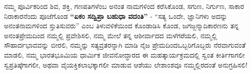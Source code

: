 ನಮ್ಮ ಪೂರ್ವಿಕರಿಂದ ಶಿವ, ಶಕ್ತಿ, ಗಣಪತಿಗಳೆಂಬ ಅನಂತ ನಾಮಗಳಿಂದ ಕರೆಸಿಕೊಂಡ, ಸಗುಣ, ನಿರ್ಗುಣ, ಸಾಕಾರ ನಿರಾಕಾರನೆಂದು ಪೂಜೆಗೊಂಡ \textbf{“ಏಕಂ ಸದ್ವಿಪ್ರಾ ಬಹುಧಾ ವದಂತಿ”} - “ಸತ್ಯ ಒಂದೇ, ಜ್ಞಾನಿಗಳು ಅದನ್ನು ಅನಂತನಾಮಗಳಿಂದ ಸ್ತುತಿಸುವರು” ಎಂಬ ತಿಳುವಳಿಕೆಯಿಂದ ಕೊಂಡಾಡಿಸಿ ಕೊಂಡ, ಜಗಜ್ಜನ್ಮಾದಿಕಾರಣನು ತನ್ನ ಅನಂತಪ್ರೇಮದಿಂದ ನಮ್ಮಲ್ಲಿ ಪ್ರವೇಶಿಸಲಿ, ನಮ್ಮ ಮೇಲೆ ತನ್ನ ಆಶೀರ್ವಾದದ ಮಳೆಗರೆಯಲಿ, ನಮ್ಮಲ್ಲಿ ಸೌಹಾರ್ದ\-ಭಾವವನ್ನು ಬೀರಲಿ, ನಮ್ಮನ್ನು ಸತ್ಯವ್ರತರನ್ನಾಗಿ ಮಾಡಿ ನೈಜ ಪ್ರೇಮದಿಂದ\break ಒಬ್ಬರಿಗೊಬ್ಬರು ನೆರವಾಗುವಂತೆ ಮಾಡಲಿ, ನಮ್ಮ ಭಾರತಭೂಮಿಯ ಧಾರ್ಮಿಕ ಜೀವನೋದ್ಧಾರದ ಈ ಮಹತ್ಕಾರ್ಯಕ್ರಮದಲ್ಲಿ ಸ್ವಂತ ಕೀರ್ತಿಗಾಗಲೀ ಸ್ವಪ್ರತಿಷ್ಠೆಗಾಗಲೀ, ಅಥವಾ ವೈಯಕ್ತಿಕಲಾಭಕ್ಕಾಗಲೀ ಮಾಡುವ ಆಶೆಯು ಲೇಶಾಂಶವೂ ನಮ್ಮಲ್ಲಿರದಂತೆ ಅನುಗ್ರಹಿಸಲಿ!

